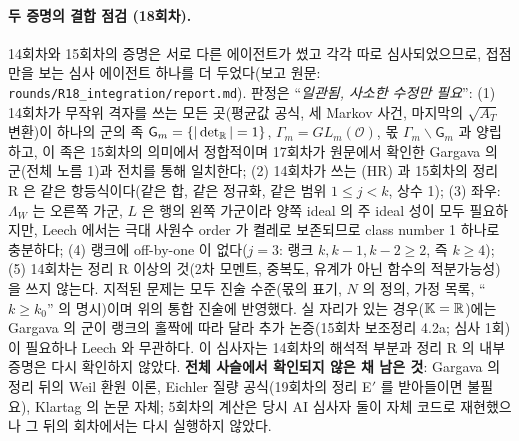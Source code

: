 \paragraph{두 증명의 결합 점검 (18회차).} 14회차와 15회차의 증명은 서로 다른 에이전트가 썼고 각각 따로 심사되었으므로, 접점만을 보는 심사 에이전트 하나를 더 두었다(보고 원문: \texttt{rounds/R18\_integration/report.md}). 판정은 ``\emph{일관됨, 사소한 수정만 필요}'': (1) 14회차가 무작위 격자를 쓰는 모든 곳(평균값 공식, 세 Markov 사건, 마지막의 $\sqrt{A_T}$ 변환)이 하나의 군의 족 $\mathsf G_m=\{|\det_{\mathbb{R}}|=1\}$, $\Gamma_m=GL_m(\mathcal O)$, 몫 $\Gamma_m\backslash\mathsf G_m$ 과 양립하고, 이 족은 15회차의 의미에서 정합적이며 17회차가 원문에서 확인한 Gargava 의 군(전체 노름 1)과 전치를 통해 일치한다; (2) 14회차가 쓰는 (HR) 과 15회차의 정리 R 은 같은 항등식이다(같은 합, 같은 정규화, 같은 범위 $1\le j<k$, 상수 1); (3) 좌우: $\Lambda_W$ 는 오른쪽 가군, $L$ 은 행의 왼쪽 가군이라 양쪽 ideal 의 주 ideal 성이 모두 필요하지만, Leech 에서는 극대 사원수 order 가 켤레로 보존되므로 class number 1 하나로 충분하다; (4) 랭크에 off-by-one 이 없다($j=3$: 랭크 $k,k-1,k-2\ge2$, 즉 $k\ge4$); (5) 14회차는 정리 R 이상의 것(2차 모멘트, 중복도, 유계가 아닌 함수의 적분가능성)을 쓰지 않는다. 지적된 문제는 모두 진술 수준(몫의 표기, $N$ 의 정의, 가정 목록, ``$k\ge k_0$'' 의 명시)이며 위의 통합 진술에 반영했다. 실 자리가 있는 경우($\mathbb K=\mathbb{R}$)에는 Gargava 의 군이 랭크의 홀짝에 따라 달라 추가 논증(15회차 보조정리 4.2a; 심사 1회)이 필요하나 Leech 와 무관하다. 이 심사자는 14회차의 해석적 부분과 정리 R 의 내부 증명은 다시 확인하지 않았다. \textbf{전체 사슬에서 확인되지 않은 채 남은 것}: Gargava 의 정리 뒤의 Weil 환원 이론, Eichler 질량 공식(19회차의 정리 E$'$ 를 받아들이면 불필요), Klartag 의 논문 자체; 5회차의 계산은 당시 AI 심사자 둘이 자체 코드로 재현했으나 그 뒤의 회차에서는 다시 실행하지 않았다.

